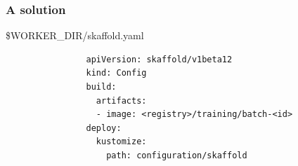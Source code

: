 	\begin{frame}[fragile]
		\frametitle{A solution}
		
		\begin{block}{\$WORKER\_DIR/skaffold.yaml}
			\begin{verbatim}
				apiVersion: skaffold/v1beta12
				kind: Config
				build:
				  artifacts:
				  - image: <registry>/training/batch-<id>
				deploy:
				  kustomize:
				    path: configuration/skaffold
			\end{verbatim}
		\end{block}
	\end{frame}